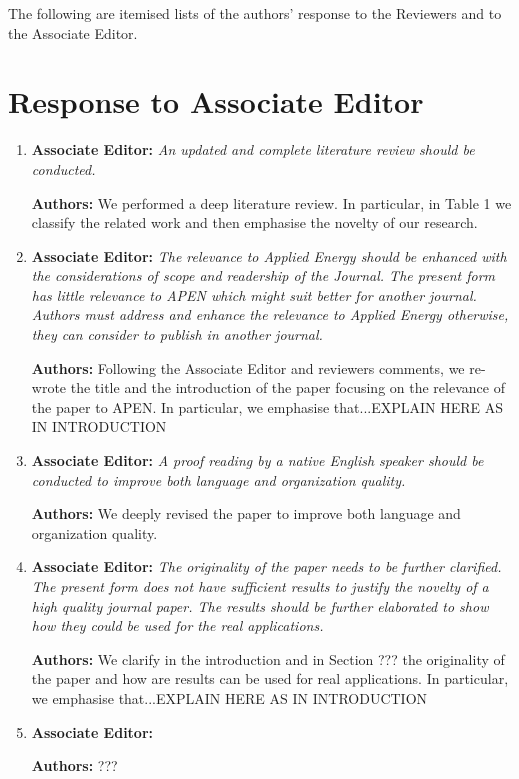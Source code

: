 \documentclass{article}
\begin{document}
The following are itemised lists of the authors' response to the Reviewers and to the Associate Editor.



\section{Response to Associate Editor}



\begin{enumerate}

	\item \textbf{Associate Editor:} \textit{An updated and complete literature review should be conducted.}
		

	\textbf{Authors:} We performed a deep literature review. In particular, in Table 1 we classify the related work and then emphasise the novelty of our research.

	\item \textbf{Associate Editor:} \textit{The relevance to Applied Energy should be enhanced with the considerations of scope and readership of the Journal.  The present form has little relevance to APEN which might suit better for another journal. Authors must address and enhance the relevance to Applied Energy otherwise, they can consider to publish in another journal.}
	
	\textbf{Authors:} Following the Associate Editor and reviewers comments, we re-wrote the title and the introduction of the paper focusing on the relevance of the paper to APEN. In particular, we emphasise that...EXPLAIN HERE AS IN INTRODUCTION

	

	\item \textbf{Associate Editor:} \textit{A proof reading by a native English speaker should be conducted to improve both language and organization quality. }

	

	\textbf{Authors:} We deeply revised the paper to improve both language and organization quality.

	

	\item \textbf{Associate Editor:} \textit{The originality of the paper needs to be further clarified. The present form does not have sufficient results to justify the novelty of a high quality journal paper. The results should be further elaborated to show how they could be used for the real applications.}

	

	\textbf{Authors:} We clarify in the introduction and in Section ??? the originality of the paper and how are results can be used for real applications. In particular, we emphasise that...EXPLAIN HERE AS IN INTRODUCTION

	

	\item \textbf{Associate Editor:} \textit{}

	

	\textbf{Authors:} ???

	

\end{enumerate}
\end{document}
